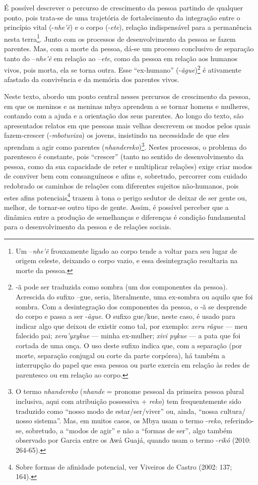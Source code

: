 É possível descrever o percurso de crescimento da pessoa partindo de
qualquer ponto, pois trata-se de uma trajetória de fortalecimento da
integração entre o princípio vital (-\emph{nhe’ẽ}) e o corpo (-\emph{ete}),
relação indispensável para a permanência nesta terra\footnote{Um
–\emph{nhe’ẽ} frouxamente ligado ao corpo tende a voltar para seu lugar
de origem celeste, deixando o corpo vazio, e essa desintegração
resultaria na morte da pessoa.}. Junto com os processos de
desenvolvimento da pessoa se fazem parentes. Mas, com a morte da
pessoa, dá-se um processo conclusivo de separação tanto do –\emph{nhe’ẽ}
em relação ao –\emph{ete}, como da pessoa em relação aos humanos vivos, pois
morta, ela se torna outra. Esse ``ex-humano'' (-\emph{ãgue})\footnote{-ã pode
ser traduzida como sombra (um dos componentes da pessoa). Acrescida do
sufixo –gue, seria, literalmente, uma ex-sombra ou aquilo que foi
sombra. Com a desintegração dos componentes da pessoa, o -ã se
desprende do corpo e passa a ser -\emph{ãgue}. O sufixo gue/kue, neste caso, é
usado para indicar algo que deixou de existir como tal, por exemplo:
\emph{xeru rãgue} --- meu falecido pai; \emph{xera’yxykue} --- minha ex-mulher; \emph{xivi
pykue} --- a pata que foi cortada de uma onça. O uso deste sufixo indica
que, com a separação (por morte, separação conjugal ou corte da parte
corpórea), há também a interrupção do papel que essa pessoa ou parte
exercia em relação às redes de parentesco ou em relação ao corpo.} é
ativamente afastado da convivência e da memória dos parentes vivos. 

Neste texto, abordo um ponto central nesses percursos de crescimento da
pessoa, em que os meninos e as meninas mbya aprendem a se tornar homens
e mulheres, contando com a ajuda e a orientação dos seus parentes. Ao
longo do texto, são apresentados relatos em que pessoas mais velhas
descrevem os modos pelos quais fazem-crescer (-\emph{mbotuvixa}) os jovens,
insistindo na necessidade de que eles aprendam a agir como parentes
(\emph{nhandereko})\footnote{O termo \emph{nhandereko} (\emph{nhande} = pronome pessoal da
primeira pessoa plural inclusiva, aqui com atribuição possessiva +
\emph{reko}) tem frequentemente sido traduzido como ``nosso modo de
estar/ser/viver'' ou, ainda, ``nossa cultura/ nosso sistema''. Mas, em
muitos casos, os Mbya usam o termo -\emph{reko}, referindo-se, sobretudo, a
``modos de agir'' e não a ``formas de ser'', algo também observado por Garcia
entre os Awá Guajá, quando usam o termo -\emph{rikô} (2010: 264-65).}. Nestes
processos, o problema do parentesco é constante, pois ``crescer'' (tanto
no sentido de desenvolvimento da pessoa, como da sua capacidade de
reter e multiplicar relações) exige criar modos de conviver bem com
consanguíneos e afins e, sobretudo, percorrer com cuidado redobrado os
caminhos de relações com diferentes sujeitos não-humanos, pois estes
afins potenciais\footnote{Sobre formas de afinidade potencial, ver
Viveiros de Castro (2002: 137; 164).} trazem à tona o perigo sedutor de
deixar de ser gente ou, melhor, de tornar-se outro tipo de gente.
Assim, é possível perceber que a dinâmica entre a produção de
semelhanças e diferenças é condição fundamental para o desenvolvimento
da pessoa e de relações sociais.  

